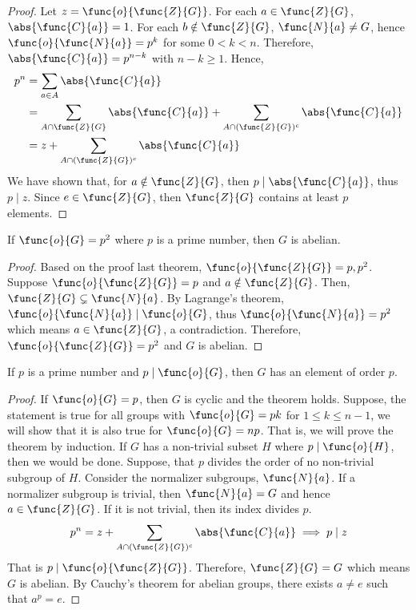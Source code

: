 \begin{proof}
    Let \(z = \func{o}{\func{Z}{G}}\). For each \(a \in \func{Z}{G}\), \(\abs{\func{C}{a} }= 1\). For each \(b \notin \func{Z}{G}\), \(\func{N}{a} \neq G\), hence \(\func{o}{\func{N}{a}} = p^{k}\) for some \(0 < k < n\). Therefore, \(\abs{\func{C}{a}} = p^{n - k}\) with \(n - k \geq 1\). Hence, 
    \begin{align*}
        p^n &= \sum_{a \in A} \abs{\func{C}{a}} \\
        &= \sum_{A \cap \func{Z}{G}} \abs{\func{C}{a}} + \sum_{A \cap (\func{Z}{G})^c} \abs{\func{C}{a}}\\
        &= z + \sum_{A \cap (\func{Z}{G})^c} \abs{\func{C}{a}}
    \end{align*}
    We have shown that, for \(a \notin \func{Z}{G}\), then \(p \mid \abs{\func{C}{a}}\), thus \(p \mid z\). Since \(e \in \func{Z}{G}\), then \(\func{Z}{G}\) contains at least \(p\) elements.
\end{proof}

\begin{corollary}
    If \(\func{o}{G} = p^2\) where \(p\) is a prime number, then \(G\) is abelian.
\end{corollary}

\begin{proof}
    Based on the proof last theorem, \(\func{o}{\func{Z}{G}}= p,p^2\). Suppose \(\func{o}{\func{Z}{G}} = p\) and \(a \notin \func{Z}{G}\). Then, \(\func{Z}{G} \subsetneq \func{N}{a}\). By Lagrange's theorem, \(\func{o}{\func{N}{a}} \mid \func{o}{G}\), thus \(\func{o}{\func{N}{a}} = p^2\) which means \(a \in \func{Z}{G}\), a contradiction. Therefore, \(\func{o}{\func{Z}{G}} = p^2\) and \(G\) is abelian.
\end{proof}

\begin{theorem}[Cauchy]
    If \(p\) is a prime number and \(p \mid \func{o}{G}\), then \(G\) has an element of order \(p\).
\end{theorem}

\begin{proof}
    If \(\func{o}{G} = p\), then \(G\) is cyclic and the theorem holds. Suppose, the statement is true for all groups with \(\func{o}{G} = pk\) for \(1 \leq k \leq n-1\), we will show that it is also true for \(\func{o}{G} = np\). That is, we will prove the theorem by induction. If \(G\) has a non-trivial subset \(H\) where \(p \mid \func{o}{H}\), then we would be done. Suppose, that \(p\) divides the order of no non-trivial subgroup of \(H\). Consider the normalizer subgroups, \(\func{N}{a}\). If a normalizer subgroup is trivial, then \(\func{N}{a} = G\) and hence \(a \in \func{Z}{G}\). If it is not trivial, then its index divides \(p\). 
    \begin{equation*}
        p^n = z + \sum_{A \cap (\func{Z}{G})^c} \abs{\func{C}{a}} \implies p \mid z
    \end{equation*} 
    That is \(p \mid \func{o}{\func{Z}{G}}\). Therefore, \(\func{Z}{G} = G\) which means \(G\) is abelian. By Cauchy's theorem for abelian groups, there exists \(a \neq e\) such that \(a^p = e\).
\end{proof}

